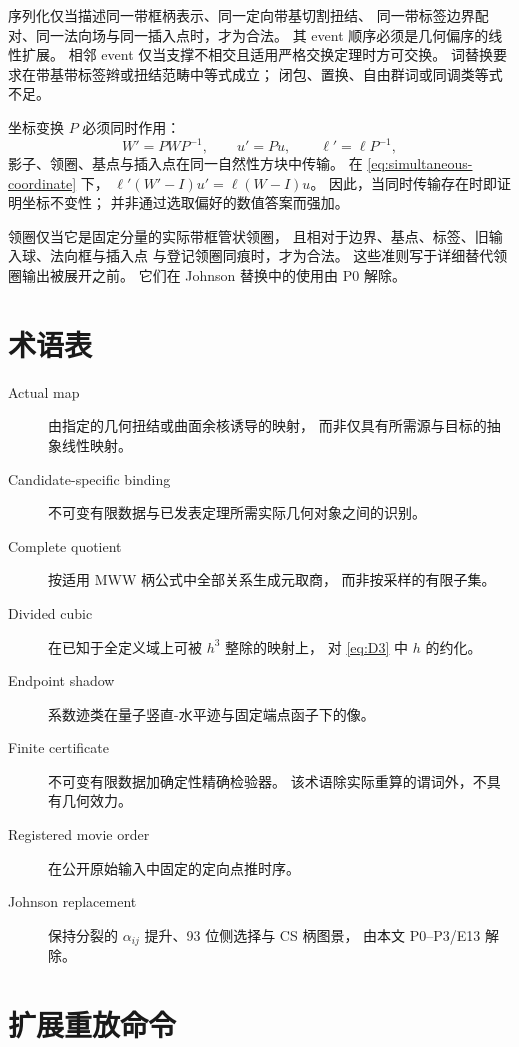 序列化仅当描述同一带框柄表示、同一定向带基切割扭结、
同一带标签边界配对、同一法向场与同一插入点时，才为合法。
其 event 顺序必须是几何偏序的线性扩展。
相邻 event 仅当支撑不相交且适用严格交换定理时方可交换。
词替换要求在带基带标签辫或扭结范畴中等式成立；
闭包、置换、自由群词或同调类等式不足。

坐标变换 $P$ 必须同时作用：
\begin{equation}\label{eq:simultaneous-coordinate}
W'=PWP^{-1},\qquad u'=Pu,\qquad
\ell'=\ell P^{-1},
\end{equation}
影子、领圈、基点与插入点在同一自然性方块中传输。
在 \eqref{eq:simultaneous-coordinate} 下，
$\ell'(W'-I)u'=\ell(W-I)u$。
因此，当同时传输存在时即证明坐标不变性；
并非通过选取偏好的数值答案而强加。

领圈仅当它是固定分量的实际带框管状领圈，
且相对于边界、基点、标签、旧输入球、法向框与插入点
与登记领圈同痕时，才为合法。
这些准则写于详细替代领圈输出被展开之前。
它们在 Johnson 替换中的使用由 P0 解除。

\section{术语表}\label{app:glossary}

\begin{description}
\item[Actual map]
由指定的几何扭结或曲面余核诱导的映射，
而非仅具有所需源与目标的抽象线性映射。
\item[Candidate-specific binding]
不可变有限数据与已发表定理所需实际几何对象之间的识别。
\item[Complete quotient]
按适用 MWW 柄公式中全部关系生成元取商，
而非按采样的有限子集。
\item[Divided cubic]
在已知于全定义域上可被 $h^3$ 整除的映射上，
对 \eqref{eq:D3} 中 $h$ 的约化。
\item[Endpoint shadow]
系数迹类在量子竖直-水平迹与固定端点函子下的像。
\item[Finite certificate]
不可变有限数据加确定性精确检验器。
该术语除实际重算的谓词外，不具有几何效力。
\item[Registered movie order]
在公开原始输入中固定的定向点推时序。
\item[Johnson replacement]
保持分裂的 $\alpha_{ij}$ 提升、93 位侧选择与 CS 柄图景，
由本文 P0--P3/E13 解除。
\end{description}

\section{扩展重放命令}\label{sec:reproducibility-extended}

